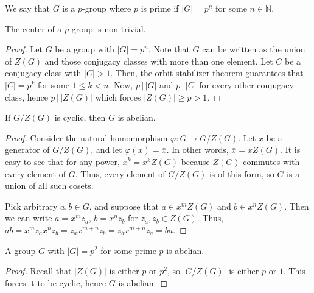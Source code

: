 \documentclass[11pt]{article}
\newcommand{\N}{\mathbb{N}}
\theoremstyle{definition}
\theoremstyle{remark}
\numberwithin{equation}{section}
\begin{document}
    \begin{definition}
        We say that $G$ is a $p$-group where $p$ is prime if $|G| = p^n$ for some $n
        \in \N$.
    \end{definition}

    \begin{lemma}
        The center of a $p$-group is non-trivial.
    \end{lemma}
    \begin{proof}
        Let $G$ be a group with $|G| = p^n$. Note that $G$ can be written as the
        union of $Z(G)$ and those conjugacy classes with more than one element. Let
        $C$ be a conjugacy class with $|C| > 1$. Then, the orbit-stabilizer theorem
        guarantees that $|C| = p^k$ for some $1 \leq k < n$. Now, $p \,|\, |G|$ and
        $p \,|\, |C|$ for every other conjugacy class, hence $p \,|\, |Z(G)|$ which
        forces $|Z(G)| \geq p > 1$.
    \end{proof}

    \begin{lemma}
        If $G / Z(G)$ is cyclic, then $G$ is abelian.
    \end{lemma}
    \begin{proof}
        Consider the natural homomorphism $\varphi\colon G \to G / Z(G)$. Let
        $\bar{x}$ be a generator of $G / Z(G)$, and let $\varphi(x) = \bar{x}$. In
        other words, $\bar{x} = xZ(G)$. It is easy to see that for any power,
        $\bar{x}^k = x^k Z(G)$ because $Z(G)$ commutes with every element of $G$.
        Thus, every element of $G / Z(G)$ is of this form, so $G$ is a union of all
        such cosets.

        Pick arbitrary $a, b \in G$, and suppose that $a \in x^m Z(G)$ and $b \in x^n
        Z(G)$. Then we can write $a = x^mz_a$, $b = x^nz_b$ for $z_a, z_b \in Z(G)$.
        Thus, $ab = x^mz_ax^nz_b = z_a x^{m + n}z_b = z_b x^{m + n} z_a = ba$.
    \end{proof}

    \begin{theorem}
        A group $G$ with $|G| = p^2$ for some prime $p$ is abelian.
    \end{theorem}
    \begin{proof}
        Recall that $|Z(G)|$ is either $p$ or $p^2$, so $|G / Z(G)|$ is either $p$ or
        $1$. This forces it to be cyclic, hence $G$ is abelian.
    \end{proof}
\end{document}
